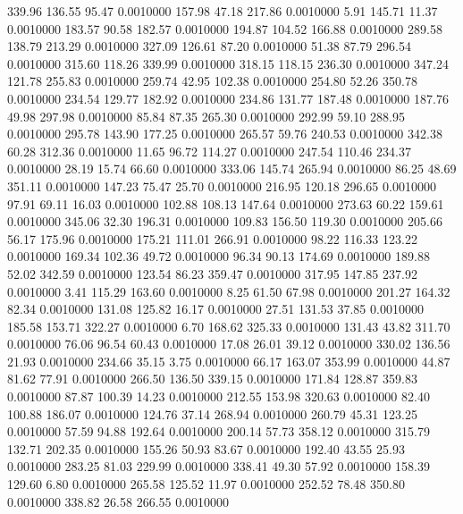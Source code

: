 339.96  136.55   95.47   0.0010000
 157.98   47.18  217.86   0.0010000
   5.91  145.71   11.37   0.0010000
 183.57   90.58  182.57   0.0010000
 194.87  104.52  166.88   0.0010000
 289.58  138.79  213.29   0.0010000
 327.09  126.61   87.20   0.0010000
  51.38   87.79  296.54   0.0010000
 315.60  118.26  339.99   0.0010000
 318.15  118.15  236.30   0.0010000
 347.24  121.78  255.83   0.0010000
 259.74   42.95  102.38   0.0010000
 254.80   52.26  350.78   0.0010000
 234.54  129.77  182.92   0.0010000
 234.86  131.77  187.48   0.0010000
 187.76   49.98  297.98   0.0010000
  85.84   87.35  265.30   0.0010000
 292.99   59.10  288.95   0.0010000
 295.78  143.90  177.25   0.0010000
 265.57   59.76  240.53   0.0010000
 342.38   60.28  312.36   0.0010000
  11.65   96.72  114.27   0.0010000
 247.54  110.46  234.37   0.0010000
  28.19   15.74   66.60   0.0010000
 333.06  145.74  265.94   0.0010000
  86.25   48.69  351.11   0.0010000
 147.23   75.47   25.70   0.0010000
 216.95  120.18  296.65   0.0010000
  97.91   69.11   16.03   0.0010000
 102.88  108.13  147.64   0.0010000
 273.63   60.22  159.61   0.0010000
 345.06   32.30  196.31   0.0010000
 109.83  156.50  119.30   0.0010000
 205.66   56.17  175.96   0.0010000
 175.21  111.01  266.91   0.0010000
  98.22  116.33  123.22   0.0010000
 169.34  102.36   49.72   0.0010000
  96.34   90.13  174.69   0.0010000
 189.88   52.02  342.59   0.0010000
 123.54   86.23  359.47   0.0010000
 317.95  147.85  237.92   0.0010000
   3.41  115.29  163.60   0.0010000
   8.25   61.50   67.98   0.0010000
 201.27  164.32   82.34   0.0010000
 131.08  125.82   16.17   0.0010000
  27.51  131.53   37.85   0.0010000
 185.58  153.71  322.27   0.0010000
   6.70  168.62  325.33   0.0010000
 131.43   43.82  311.70   0.0010000
  76.06   96.54   60.43   0.0010000
  17.08   26.01   39.12   0.0010000
 330.02  136.56   21.93   0.0010000
 234.66   35.15    3.75   0.0010000
  66.17  163.07  353.99   0.0010000
  44.87   81.62   77.91   0.0010000
 266.50  136.50  339.15   0.0010000
 171.84  128.87  359.83   0.0010000
  87.87  100.39   14.23   0.0010000
 212.55  153.98  320.63   0.0010000
  82.40  100.88  186.07   0.0010000
 124.76   37.14  268.94   0.0010000
 260.79   45.31  123.25   0.0010000
  57.59   94.88  192.64   0.0010000
 200.14   57.73  358.12   0.0010000
 315.79  132.71  202.35   0.0010000
 155.26   50.93   83.67   0.0010000
 192.40   43.55   25.93   0.0010000
 283.25   81.03  229.99   0.0010000
 338.41   49.30   57.92   0.0010000
 158.39  129.60    6.80   0.0010000
 265.58  125.52   11.97   0.0010000
 252.52   78.48  350.80   0.0010000
 338.82   26.58  266.55   0.0010000
